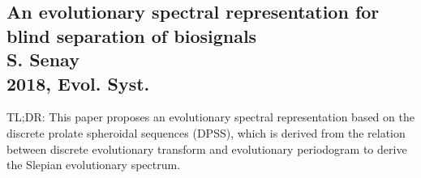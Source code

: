 \documentclass{article}
\begin{document}
\subsection{An evolutionary spectral representation for blind separation of biosignals \\
S. Senay \\
2018, Evol. Syst.}
TL;DR: This paper proposes an evolutionary spectral representation based on the discrete prolate spheroidal sequences (DPSS), which is derived from the relation between discrete evolutionary transform and evolutionary periodogram to derive the Slepian evolutionary spectrum. \\

\end{document}
